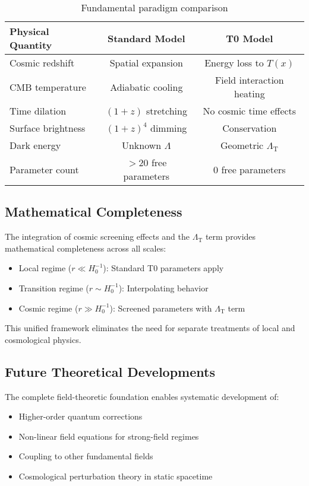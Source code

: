 \documentclass[12pt,a4paper]{article}
\newcommand{\Tfield}{T(x)}
\newcommand{\LambdaT}{\Lambda_{\text{T}}}
\begin{document}
	\begin{table}[htbp]
		\centering
		\begin{tabular}{|l|c|c|}
			\hline
			\textbf{Physical Quantity} & \textbf{Standard Model} & \textbf{T0 Model} \\
			\hline
			Cosmic redshift & Spatial expansion & Energy loss to $\Tfield$ \\
			CMB temperature & Adiabatic cooling & Field interaction heating \\
			Time dilation & $(1+z)$ stretching & No cosmic time effects \\
			Surface brightness & $(1+z)^4$ dimming & Conservation \\
			Dark energy & Unknown $\Lambda$ & Geometric $\LambdaT$ \\
			Parameter count & $>20$ free parameters & 0 free parameters \\
			\hline
		\end{tabular}
		\caption{Fundamental paradigm comparison}
	\end{table}
	
	\subsection{Mathematical Completeness}
	\label{subsec:mathematical_completeness}
	
	The integration of cosmic screening effects and the $\LambdaT$ term provides mathematical completeness across all scales:
	
	\begin{itemize}
		\item Local regime ($r \ll H_0^{-1}$): Standard T0 parameters apply
		\item Transition regime ($r \sim H_0^{-1}$): Interpolating behavior
		\item Cosmic regime ($r \gg H_0^{-1}$): Screened parameters with $\LambdaT$ term
	\end{itemize}
	
	This unified framework eliminates the need for separate treatments of local and cosmological physics.
	
	\subsection{Future Theoretical Developments}
	\label{subsec:future_theory}
	
	The complete field-theoretic foundation enables systematic development of:
	\begin{itemize}
		\item Higher-order quantum corrections
		\item Non-linear field equations for strong-field regimes  
		\item Coupling to other fundamental fields
		\item Cosmological perturbation theory in static spacetime
	\end{itemize}
	
\end{document}
